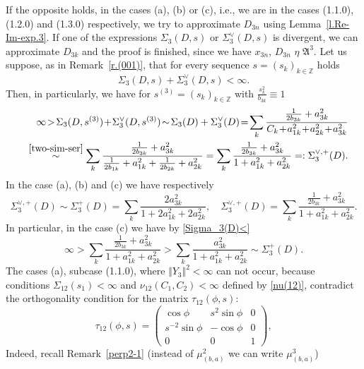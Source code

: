\documentclass[preprint,12pt]{elsarticle}
\numberwithin{equation}{section}
\begin{document}
If the opposite holds, in the cases (a), (b) or 
(c), i.e., we are in the cases (1.1.0), (1.2.0) and (1.3.0) respectively, we try to approximate $D_{3n}$  using Lemma~\ref{l.Re-Im-exp.3}. 
%
If one of the expressions  $\Sigma_3(D,s)$ or $\Sigma^{\vee}_3(D,s)$ is divergent, we can approximate $D_{3k}$ and the proof is finished,  since we have  $x_{3n},\,D_{3n}\,\,\eta\,\, {\mathfrak A}^3$. Let us suppose,  as in Remark~\ref{r.(001)},
that for every sequence $s=(s_k)_{k\in \mathbb Z}$ holds 
$$
\Sigma_3(D,s)+\Sigma^{\vee}_3(D,s)<\infty.
$$
Then, in particularly, we have for $s^{(3)}=(s_{k})_{k\in \mathbb Z}$
with $\frac{s^2_{k}}{b_{3k}}\equiv 1$
\begin{eqnarray}
 \nonumber
&& 
 \infty\!>\! \Sigma_3(D,s^{(3)})\!+\!\Sigma^{\vee}_3(D,s^{(3)})\!\sim\! \Sigma_3(D)+\Sigma^{\vee}_3(D)\!=\!\sum_k\frac{\frac{1}{2b_{3k}}+a^2_{3k}}{C_k\!+\!a^2_{1k}\!+\!a^2_{2k}\!+\!a^2_{3k}}\\
\label{Sigma_3(D)<} 
&&
\stackrel{\eqref{two-sim-ser}}{\sim}
\sum_k\frac{
\frac{1}{2b_{3k}}+a^2_{3k}}{\frac{1}{2b_{1k}}+a^2_{1k}+
\frac{1}{2b_{2k}}+a^2_{2k}}=
\sum_k\frac{\frac{1}{2b_{3k}}+a^2_{3k}}{1
+a^2_{1k}
+a^2_{2k}}=:\Sigma^{\vee,+}_3(D).
\end{eqnarray}
In the case (a), (b) and (c) we have respectively  $$\Sigma^{\vee,+}_3(D)\sim \Sigma^+_3(D)=\sum_k\frac{2a^2_{3k}}
{1+2a^2_{1k}+2a^2_{2k}},\quad 
\Sigma^{\vee,+}_3(D)=
\sum_k\frac{\frac{1}{2b_{3k}}+a^2_{3k}}{1
+a^2_{1k}
+a^2_{2k}}.
$$
In particular, in the case (c) we have by \eqref{Sigma_3(D)<} 
\begin{equation}
\label{Sigma-3(D)}
\infty>
\sum_k\frac{\frac{1}{2b_{3k}}+a^2_{3k}}{1
+a^2_{1k}
+a^2_{2k}}>
\sum_k\frac{a^2_{3k}}{1
+a^2_{1k}
+a^2_{2k}}\sim\Sigma^+_3(D).
\end{equation}
%
 The cases (a), subcase 
(1.1.0),  where $\Vert Y_3\Vert^2<\infty$ can not occur, because conditions
$\Sigma_{12}(s_1)<\infty$ and 
$\nu_{12}(C_1,C_2)<\infty$ defined by \eqref{nu(12)}, contradict the orthogonality condition for the matrix $\tau_{12}(\phi,s)$:
\begin{equation}
\tau_{12}(\phi,s)= \left(
\begin{array}{ccc}
\cos\phi&s^2\sin\phi&0\\
s^{-2}\sin\phi&-\cos\phi&0\\
0&0&1
\end{array}
\right), 
\end{equation}
%
Indeed, recall Remark~\ref{perp2-1} (instead of $\mu_{(b,a)}^2$ we can write $\mu_{(b,a)}^3$)
\end{document}
